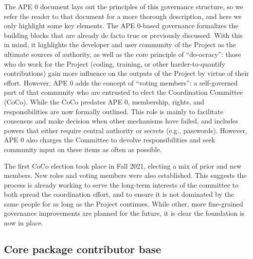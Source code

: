 \documentclass[modern]{aastex631}
\newcommand{\secauthor}[1]{{\color{blue}Author:~\textit{#1}}}
\begin{document}
The APE 0 \citep{ape0} document lays out the principles of this governance
structure, so we refer the reader to that document for a more thorough
description, and here we only highlight some key elements. The APE 0-based
governance formalizes the building blocks that are already de facto true or
previously discussed.
With this in mind, it highlights the developer and user community of the
\astropy Project as the ultimate sources of authority, as well as the core
principle of ``do-ocracy'': those who do work for the Project (coding,
training, or other harder-to-quantify contributions) gain more influence on the
outputs of the Project by virtue of their effort. However, APE 0 adds the
concept of ``voting members'': a self-governed part of that community who are
entrusted to elect the Coordination Committee (CoCo). While the CoCo
predates APE 0, membership, rights, and responsibilities are now formally outlined.
This role is mainly to facilitate consensus and make decision
when other mechanisms have failed, and includes powers that either
require central authority or secrets (e.g., passwords). However, APE 0 also
charges the Committee to devolve responsibilities and seek community input on
these items as often as possible.

The first CoCo election took place in Fall 2021, electing a mix of prior and new members.
New roles and voting members were also established. This
suggests the process is already working to serve the long-term interests of the
committee to both spread the coordination effort, and to ensure it is not
dominated by the same people for as long as the Project continues. While other,
more fine-grained governance improvements are planned for the future, it is
clear the foundation is now in place.


\subsection{Core package contributor base} \label{sec:project-contributors}


\end{document}

